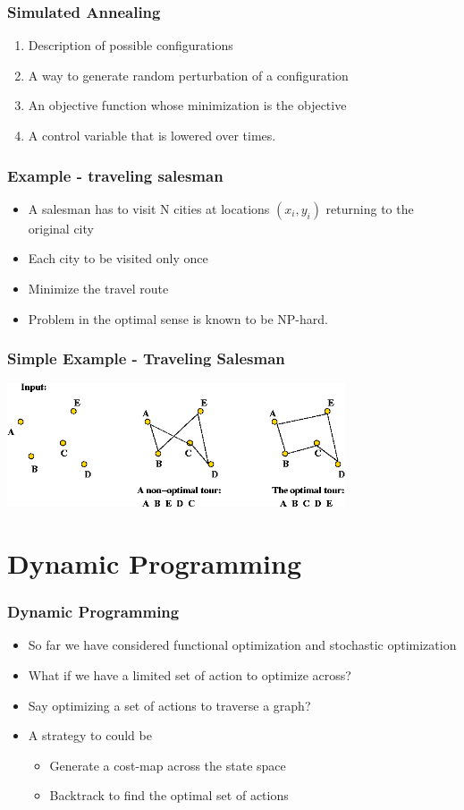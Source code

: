 \documentclass[10pt]{beamer}
\begin{document}
\begin{frame}
  \frametitle{Simulated Annealing}
  \begin{enumerate}
  \item Description of possible configurations
  \item A way to generate random perturbation of a configuration
  \item An objective function whose minimization is the objective
  \item A control variable that is lowered over times. 
  \end{enumerate}
\end{frame}

\begin{frame}
  \frametitle{Example - traveling salesman}
  \begin{itemize}
  \item A salesman has to visit N cities at locations $(x_i, y_i)$
    returning to the original city
  \item Each city to be visited only once
  \item Minimize the travel route
  \item Problem in the optimal sense is known to be NP-hard. 
  \end{itemize}
\end{frame}

\begin{frame}
  \frametitle{Simple Example - Traveling Salesman}
  \centerline{\includegraphics[width=10cm]{tsp}}
\end{frame}

\section{Dynamic Programming}
\label{sec:dynamic-programming}

\begin{frame}
  \frametitle{Dynamic Programming}
  \begin{itemize}
  \item So far we have considered functional optimization and
    stochastic optimization
  \item What if we have a limited set of action to optimize across? 
  \item Say optimizing a set of actions to traverse a graph? 
  \item A strategy to could be
    \begin{itemize}
    \item Generate a cost-map across the state space
    \item Backtrack to find the optimal set of actions
    \end{itemize}
  \end{itemize}
\end{frame}
\end{document}
